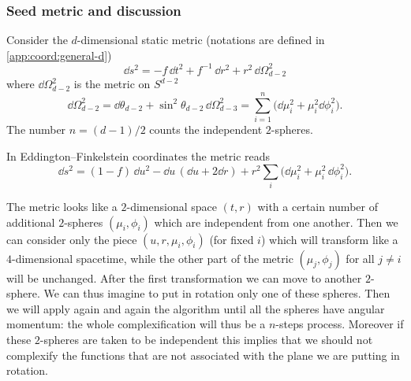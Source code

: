 \subsubsection{Seed metric and discussion}


Consider the $d$-dimensional static metric (notations are defined in \cref{app:coord:general-d})
\begin{equation}
	\dd s^2 = - f\, \dd t^2 + f^{-1}\, \dd r^2 + r^2\, \dd \Omega_{d-2}^2
\end{equation} 
where $\dd \Omega_{d-2}^2$ is the metric on $S^{d-2}$
\begin{equation}
	\dd \Omega_{d-2}^2 = \dd\theta_{d-2} + \sin^2 \theta_{d-2}\, \dd \Omega_{d-3}^2
		= \sum_{i=1}^n \big( \dd\mu_i^2 + \mu_i^2 \dd\phi_i^2).
\end{equation} 
The number $n = (d-1) / 2$ counts the independent $2$-spheres.

In Eddington--Finkelstein coordinates the metric reads
\begin{equation}
	\label{higher-jna:higher-jna:metric:static-seed}
	\dd s^2 = (1 - f)\, \dd u^2 - \dd u\, (\dd u + 2 \dd r)
			+ r^2 \sum_i \Big(\dd \mu_i^2 + \mu_i^2\, \dd \phi_i^2 \Big).
\end{equation} 

The metric looks like a $2$-dimensional space $(t, r)$ with a certain number of additional $2$-spheres $(\mu_i, \phi_i)$ which are independent from one another.
Then we can consider only the piece $(u, r, \mu_i, \phi_i)$ (for fixed $i$) which will transform like a $4$-dimensional spacetime, while the other part of the metric $(\mu_j, \phi_j)$ for all $j \neq i$ will be unchanged.
After the first transformation we can move to another $2$-sphere.
We can thus imagine to put in rotation only one of these spheres.
Then we will apply again and again the algorithm until all the spheres have angular momentum: the whole complexification will thus be a $n$-steps process.
Moreover if these $2$-spheres are taken to be independent this implies that we should not complexify the functions that are not associated with the plane we are putting in rotation.

